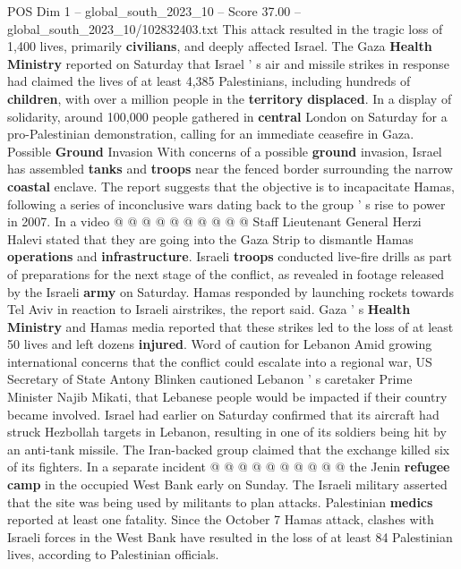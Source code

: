 \begin{textsample}{POS Dim 1 – global\_south\_2023\_10 – Score 37.00 – global\_south\_2023\_10/102832403.txt}
This attack resulted in the tragic loss of 1,400 lives, primarily \textbf{civilians}, and deeply affected Israel.
The Gaza \textbf{Health} \textbf{Ministry} reported on Saturday that Israel ' s air and missile strikes in response had claimed the lives of at least 4,385 Palestinians, including hundreds of \textbf{children}, with over a million people in the \textbf{territory} \textbf{displaced}.
In a display of solidarity, around 100,000 people gathered in \textbf{central} London on Saturday for a pro-Palestinian demonstration, calling for an immediate ceasefire in Gaza.
Possible \textbf{Ground} Invasion With concerns of a possible \textbf{ground} invasion, Israel has assembled \textbf{tanks} and \textbf{troops} near the fenced border surrounding the narrow \textbf{coastal} enclave.
The report suggests that the objective is to incapacitate Hamas, following a series of inconclusive wars dating back to the group ' s rise to power in 2007.
In a video @ @ @ @ @ @ @ @ @ @ Staff Lieutenant General Herzi Halevi stated that they are going into the Gaza Strip to dismantle Hamas \textbf{operations} and \textbf{infrastructure}.
Israeli \textbf{troops} conducted live-fire drills as part of preparations for the next stage of the conflict, as revealed in footage released by the Israeli \textbf{army} on Saturday.
Hamas responded by launching rockets towards Tel Aviv in reaction to Israeli airstrikes, the report said.
Gaza ' s \textbf{Health} \textbf{Ministry} and Hamas media reported that these strikes led to the loss of at least 50 lives and left dozens \textbf{injured}.
Word of caution for Lebanon Amid growing international concerns that the conflict could escalate into a regional war, US Secretary of State Antony Blinken cautioned Lebanon ' s caretaker Prime Minister Najib Mikati, that Lebanese people would be impacted if their country became involved.
Israel had earlier on Saturday confirmed that its aircraft had struck Hezbollah targets in Lebanon, resulting in one of its soldiers being hit by an anti-tank missile.
The Iran-backed group claimed that the exchange killed six of its fighters.
In a separate incident @ @ @ @ @ @ @ @ @ @ the Jenin \textbf{refugee} \textbf{camp} in the occupied West Bank early on Sunday.
The Israeli military asserted that the site was being used by militants to plan attacks.
Palestinian \textbf{medics} reported at least one fatality.
Since the October 7 Hamas attack, clashes with Israeli forces in the West Bank have resulted in the loss of at least 84 Palestinian lives, according to Palestinian officials.

\end{textsample}
